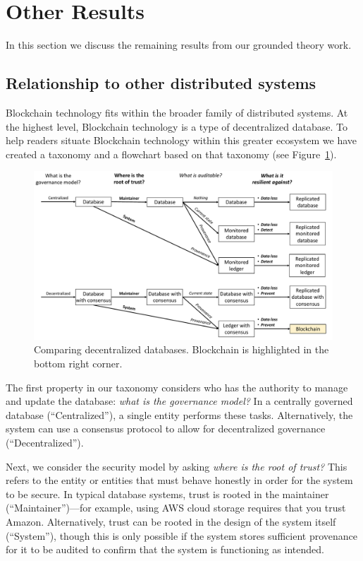 \section{Other Results}
In this section we discuss the remaining results from our grounded theory work.

\subsection{Relationship to other distributed systems}
\label{sec:distributed-comparison}
Blockchain technology fits within the broader family of distributed systems.
At the highest level, Blockchain technology is a type of decentralized database.
To help readers situate Blockchain technology within this greater ecosystem we have created a taxonomy and a flowchart based on that taxonomy (see Figure~\ref{fig:blockchainFlowchart}).

\begin{figure}
	\centering
	\includegraphics[width=\textwidth]{figures/BlockchainFlowchart}
	\caption{Comparing decentralized databases. Blockchain is highlighted in the bottom right corner.}
	\label{fig:blockchainFlowchart}
\end{figure}

The first property in our taxonomy considers who has the authority to manage and update the database: \emph{what is the governance model?} In a centrally governed database (``Centralized''), a single entity performs these tasks. Alternatively, the system can use a consensus protocol to allow for decentralized governance (``Decentralized'').

Next, we consider the security model by asking \emph{where is the root of trust?}
This refers to the entity or entities that must behave honestly in order for the system to be secure.
In typical database systems, trust is rooted in the maintainer (``Maintainer'')---for example, using AWS cloud storage requires that you trust Amazon.
Alternatively, trust can be rooted in the design of the system itself (``System''), though this is only possible if the system stores sufficient provenance for it to be audited to confirm that the system is functioning as intended.


